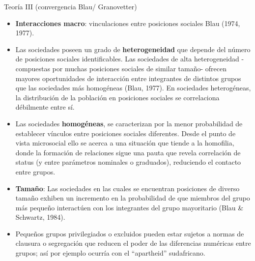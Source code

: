 \documentclass[
  8pt,
  ignorenonframetext,
]{beamer}
\begin{document}
\begin{frame}{Teoría III (convergencia Blau/ Granovetter)}
\protect\hypertarget{teoruxeda-iii-convergencia-blau-granovetter}{}
\begin{itemize}
\item
  \textbf{Interacciones macro}: vinculaciones entre posiciones sociales
  Blau (1974, 1977).
\item
  Las sociedades poseen un grado de \textbf{heterogeneidad} que depende
  del número de posiciones sociales identificables. Las sociedades de
  alta heterogeneidad -compuestas por muchas posiciones sociales de
  similar tamaño- ofrecen mayores oportunidades de interacción entre
  integrantes de distintos grupos que las sociedades más homogéneas
  (Blau, 1977). En sociedades heterogéneas, la distribución de la
  población en posiciones sociales se correlaciona débilmente entre sí.
\item
  Las sociedades \textbf{homogéneas}, se caracterizan por la menor
  probabilidad de establecer vínculos entre posiciones sociales
  diferentes. Desde el punto de vista microsocial ello se acerca a una
  situación que tiende a la homofilia, donde la formación de relaciones
  sigue una pauta que revela correlación de status (y entre parámetros
  nominales o graduados), reduciendo el contacto entre grupos.
\item
  \textbf{Tamaño}: Las sociedades en las cuales se encuentran posiciones
  de diverso tamaño exhiben un incremento en la probabilidad de que
  miembros del grupo más pequeño interactúen con los integrantes del
  grupo mayoritario (Blau \& Schwartz, 1984).
\item
  Pequeños grupos privilegiados o excluidos pueden estar sujetos a
  normas de clausura o segregación que reducen el poder de las
  diferencias numéricas entre grupos; así por ejemplo ocurría con el
  ``apartheid'' sudafricano.
\end{itemize}
\end{frame}
\end{document}
